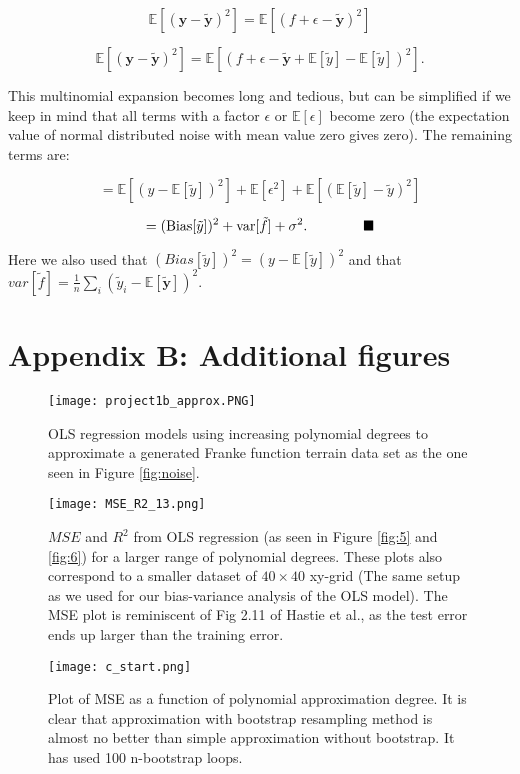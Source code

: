 \documentclass[reprint,english,notitlepage]{revtex4-1}  %
\newcommand*{\QEDA}{\hfill\ensuremath{\blacksquare}}
\begin{document}
$$\mathbb{E}\left[(\bm{y}-\bm{\tilde{y}})^2\right] = \mathbb{E}\left[(f + \epsilon -\bm{\tilde{y}})^2\right]$$

$$\mathbb{E}\left[(\bm{y}-\bm{\tilde{y}})^2\right] = \mathbb{E}\left[(f + \epsilon -\bm{\tilde{y}} + \mathbb{E}[\tilde{y}] - \mathbb{E}[\tilde{y}])^2\right].$$

This multinomial expansion becomes long and tedious, but can be simplified if we keep in mind that all terms with a factor $\epsilon$ or $\mathbb{E}[\epsilon]$ become zero (the expectation value of normal distributed noise with mean value zero gives zero). The remaining terms are:

$$ = \mathbb{E}[(y - \mathbb{E}[\tilde{y}])^2] + \mathbb{E}[\epsilon^2] + \mathbb{E}[(\mathbb{E}[\tilde{y}] - \tilde{y})^2]$$

$$=(\mathrm{Bias}[\tilde{y}])^2+\mathrm{var}[\tilde{f}]+\sigma^2. \quad \quad \quad \quad \QEDA$$

Here we also used that $(Bias[\tilde{y}])^2 = (y - \mathbb{E}[\tilde{y}])^2$ and that $var[\tilde{f}] = \frac{1}{n}\sum_i(\tilde{y}_i-\mathbb{E}\left[\bm{\tilde{y}}\right])^2$.

\section{Appendix B: Additional figures}

\onecolumngrid
\begin{figure}[h!]
    \centering
    \texttt{[image: project1b\_approx.PNG]}
    \caption{OLS regression models using increasing polynomial degrees to approximate a generated Franke function terrain data set as the one seen in Figure \ref{fig:noise}.}
    \label{fig:ols_approx}
\end{figure}

\begin{figure}[h!]
    \centering
    \texttt{[image: MSE\_R2\_13.png]}
    \caption{$MSE$ and $R^2$ from OLS regression (as seen in Figure \ref{fig:5} and \ref{fig:6}) for a larger range of polynomial degrees. These plots also correspond to a smaller dataset of $40 \times 40$ xy-grid (The same setup as we used for our bias-variance analysis of the OLS model). The MSE plot is reminiscent of Fig 2.11 of Hastie et al., as the test error ends up larger than the training error.}
    \label{fig:OLS_ext}
\end{figure}

\begin{figure}[h!]
    \centering
    \texttt{[image: c\_start.png]}
    \caption{Plot of MSE as a function of polynomial approximation degree. It is clear that approximation with bootstrap resampling method is almost no better than simple approximation without bootstrap. It has used 100 n-bootstrap loops. }
    \label{fig:fig5_modded}
\end{figure}
\twocolumngrid
\end{document}
